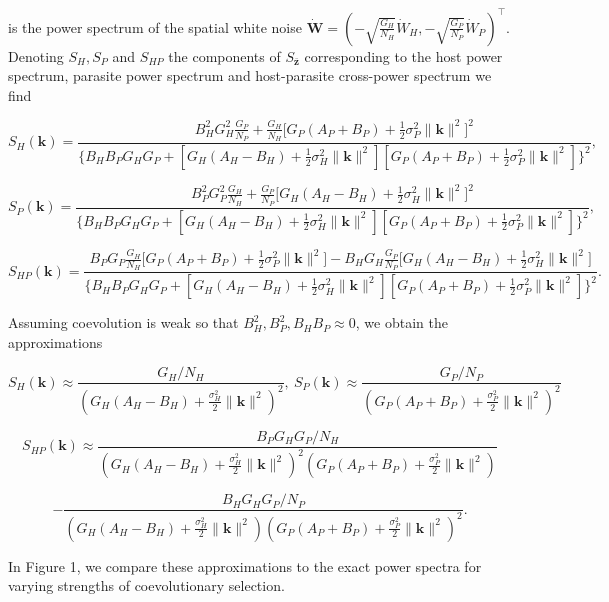 \documentclass{article}
\begin{document}
is the power spectrum of the spatial white noise
\(\dot{\pmb W}=\left(-\sqrt{\tfrac{G_H}{N_H}}{\dot W}_H, -\sqrt{\tfrac{G_P}{N_P}}{\dot W}_P\right)^\top\).
Denoting \(S_H,S_P\) and \(S_{HP}\) the components of
\(S_{\bar{\pmb z}}\) corresponding to the host power spectrum, parasite
power spectrum and host-parasite cross-power spectrum we find

\[S_H(\pmb k)=\frac{B_H^2G_H^2\frac{G_P}{N_P}+\frac{G_H}{N_H}\big[G_P(A_P+B_P)+\frac{1}{2}\sigma_P^2\|\pmb k\|^2\big]^2}{\big\{B_HB_PG_HG_P+[G_H(A_H-B_H)+\frac{1}{2}\sigma_H^2\|\pmb k\|^2][G_P(A_P+B_P)+\frac{1}{2}\sigma_P^2\|\pmb k\|^2]\big\}^2},\]

\[S_P(\pmb k)=\frac{B_P^2G_P^2\frac{G_H}{N_H}+\frac{G_P}{N_P}\big[G_H(A_H-B_H)+\frac{1}{2}\sigma_H^2\|\pmb k\|^2\big]^2}{\big\{B_HB_PG_HG_P+[G_H(A_H-B_H)+\frac{1}{2}\sigma_H^2\|\pmb k\|^2][G_P(A_P+B_P)+\frac{1}{2}\sigma_P^2\|\pmb k\|^2]\big\}^2},\]

\[S_{HP}(\pmb k)=\frac{B_PG_P\frac{G_H}{N_H}\big[G_P(A_P+B_P)+\frac{1}{2}\sigma_P^2\|\pmb k\|^2\big]-B_HG_H\frac{G_P}{N_P}\big[G_H(A_H-B_H)+\frac{1}{2}\sigma_H^2\|\pmb k\|^2\big]}{\big\{B_HB_PG_HG_P+[G_H(A_H-B_H)+\frac{1}{2}\sigma_H^2\|\pmb k\|^2][G_P(A_P+B_P)+\frac{1}{2}\sigma_P^2\|\pmb k\|^2]\big\}^2}.\]

Assuming coevolution is weak so that \(B_H^2,B_P^2,B_HB_P\approx0\), we
obtain the approximations

\[S_H(\pmb k)\approx\frac{G_H/N_H}{\left(G_H(A_H-B_H)+\frac{\sigma_H^2}{2}\|\pmb k\|^2\right)^2}, \ S_P(\pmb k)\approx\frac{G_P/N_P}{\left(G_P(A_P+B_P)+\frac{\sigma_P^2}{2}\|\pmb k\|^2\right)^2}\]

\[S_{HP}(\pmb k)\approx\frac{B_PG_HG_P/N_H}{\left(G_H(A_H-B_H)+\frac{\sigma_H^2}{2}\|\pmb k\|^2\right)^2\left(G_P(A_P+B_P)+\frac{\sigma_P^2}{2}\|\pmb k\|^2\right)}\]

\[-\frac{B_HG_HG_P/N_P}{\left(G_H(A_H-B_H)+\frac{\sigma_H^2}{2}\|\pmb k\|^2\right)\left(G_P(A_P+B_P)+\frac{\sigma_P^2}{2}\|\pmb k\|^2\right)^2}.\]

In Figure 1, we compare these approximations to the exact power spectra
for varying strengths of coevolutionary selection.
\end{document}
